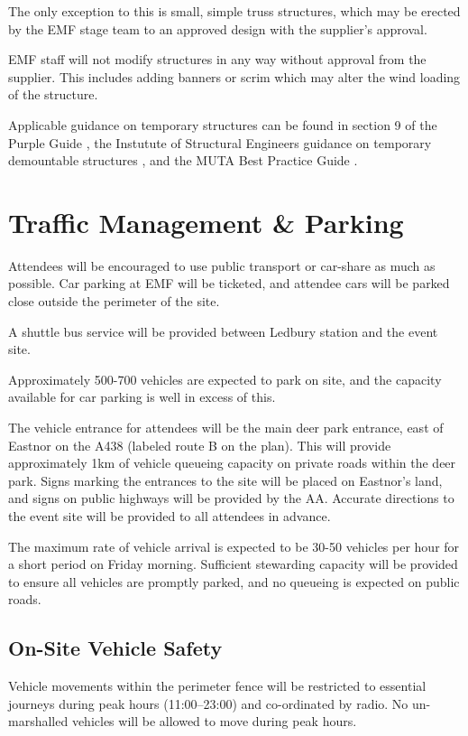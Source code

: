 The only exception to this is small, simple truss structures, which may be erected
by the EMF stage team to an approved design with the supplier's approval.

EMF staff will not modify structures in any way without approval from the supplier.
This includes adding banners or scrim which may alter the wind loading of the
structure.

Applicable guidance on temporary structures can be found in
section 9 of the Purple Guide \cite{purpleguide}, the Instutute of Structural
Engineers guidance on temporary demountable structures \cite{istructe-tds}, and
the MUTA Best Practice Guide \cite{mutaguide}.

\section{Traffic Management \& Parking}

Attendees will be encouraged to use public transport or car-share as much as
possible. Car parking at EMF will be ticketed, and attendee cars will be
parked close outside the perimeter of the site.

A shuttle bus service will be provided between Ledbury station and the event
site.

Approximately 500-700 vehicles are expected to park on site, and the capacity
available for car parking is well in excess of this.

The vehicle entrance for attendees will be the main deer park entrance, east of
Eastnor on the A438 (labeled route B on the plan). This will provide
approximately 1km of vehicle queueing capacity on private roads within the deer
park. Signs marking the entrances to the site will be placed on Eastnor's land, and
signs on public highways will be provided by the AA\@. Accurate directions to
the event site will be provided to all attendees in advance.

The maximum rate of vehicle arrival is expected to be 30-50 vehicles per hour
for a short period on Friday morning. Sufficient stewarding capacity will be
provided to ensure all vehicles are promptly parked, and no queueing is expected
on public roads.

\subsection{On-Site Vehicle Safety}\label{vehiclesafety}

Vehicle movements within the perimeter fence will be restricted to essential
journeys during peak hours (11:00--23:00) and co-ordinated by radio. No
un-marshalled vehicles will be allowed to move during peak hours.

